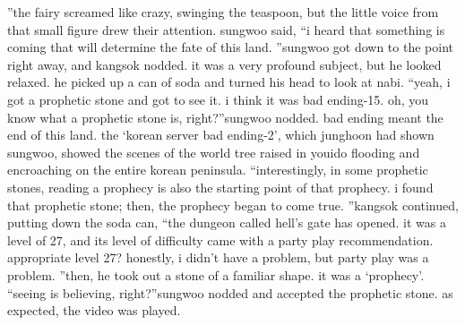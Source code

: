 ”the fairy screamed like crazy, swinging the teaspoon, but the little voice from that small figure drew their attention.
sungwoo said, “i heard that something is coming that will determine the fate of this land.
”sungwoo got down to the point right away, and kangsok nodded.
it was a very profound subject, but he looked relaxed.
 he picked up a can of soda and turned his head to look at nabi.
“yeah, i got a prophetic stone and got to see it.
 i think it was bad ending-15.
 oh, you know what a prophetic stone is, right?”sungwoo nodded.
bad ending meant the end of this land.
 the ‘korean server bad ending-2’, which junghoon had shown sungwoo, showed the scenes of the world tree raised in youido flooding and encroaching on the entire korean peninsula.
“interestingly, in some prophetic stones, reading a prophecy is also the starting point of that prophecy.
 i found that prophetic stone; then, the prophecy began to come true.
”kangsok continued, putting down the soda can, “the dungeon called hell’s gate has opened.
 it was a level of 27, and its level of difficulty came with a party play recommendation.
 appropriate level 27? honestly, i didn’t have a problem, but party play was a problem.
”then, he took out a stone of a familiar shape.
 it was a ‘prophecy’.
“seeing is believing, right?”sungwoo nodded and accepted the prophetic stone.
 as expected, the video was played.

